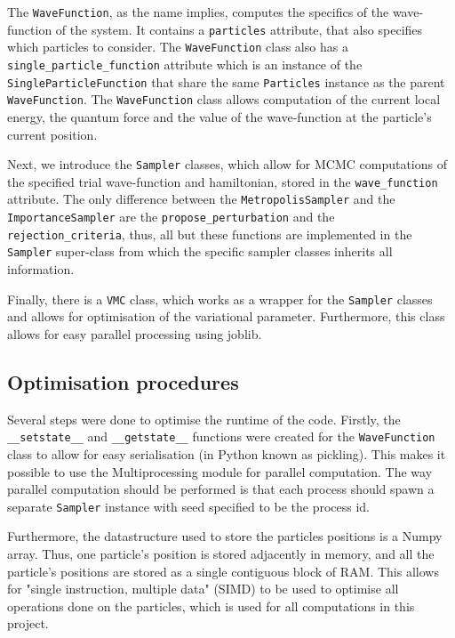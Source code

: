 \documentclass[11pt,a4paper]{article}
\numberwithin{equation}{section}
\begin{document}
The \texttt{WaveFunction}, as the name implies, computes the specifics of the wave-function of the system. It contains a \texttt{particles} attribute, that also specifies which particles to consider. The \texttt{WaveFunction} class also has a \texttt{single\_particle\_function} attribute which is an instance of the \texttt{SingleParticleFunction} that share the same \texttt{Particles} instance as the parent \texttt{WaveFunction}. The \texttt{WaveFunction} class allows computation of the current local energy, the quantum force and the value of the wave-function at the particle's current position.

Next, we introduce the \texttt{Sampler} classes, which allow for MCMC computations of the specified trial wave-function and hamiltonian, stored in the \texttt{wave\_function} attribute. The only difference between the \texttt{MetropolisSampler} and the \texttt{ImportanceSampler} are the \texttt{propose\_perturbation} and the \texttt{rejection\_criteria}, thus, all but these functions are implemented in the \texttt{Sampler} super-class from which the specific sampler classes inherits all information.

Finally, there is a \texttt{VMC} class, which works as a wrapper for the \texttt{Sampler} classes and allows for optimisation of the variational parameter. Furthermore, this class allows for easy parallel processing using joblib.

\subsection{Optimisation procedures}
Several steps were done to optimise the runtime of the code. Firstly, the \texttt{__setstate__} and \texttt{__getstate__} functions were created for the \texttt{WaveFunction} class to allow for easy serialisation (in Python known as pickling). This makes it possible to use the Multiprocessing module for parallel computation. The way parallel computation should be performed is that each process should spawn a separate \texttt{Sampler} instance with seed specified to be the process id.

Furthermore, the datastructure used to store the particles positions is a Numpy array. Thus, one particle's position is stored adjacently in memory, and all the particle's positions are stored as a single contiguous block of RAM. This allows for "single instruction, multiple data" (SIMD) to be used to optimise all operations done on the particles, which is used for all computations in this project.
\end{document}

